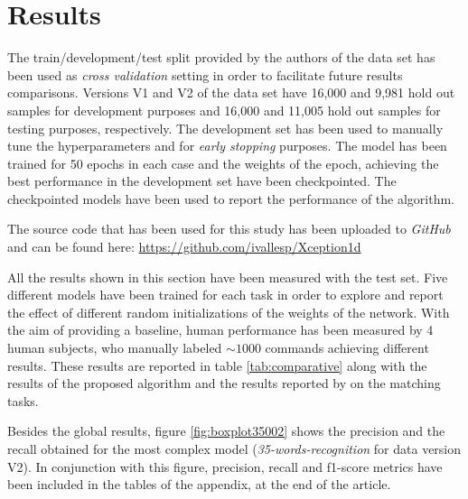 \documentclass[review]{elsarticle}
\begin{document}
\section{Results} \label{sec:results}
The train/development/test split provided by the authors of the data set \cite{speechcommands} has been used as \textit{cross validation} setting in order to facilitate future results comparisons. Versions V1 and V2 of the data set have 16,000 and 9,981 hold out samples for development purposes and 16,000 and 11,005 hold out samples for testing purposes, respectively. The development set has been used to manually tune the hyperparameters and for \textit{early stopping} purposes. The model has been trained for 50 epochs in each case and the weights of the epoch, achieving the best performance in the development set have been checkpointed. The checkpointed models have been used to report the performance of the algorithm.

 The source code that has been used for this study has been uploaded to \textit{GitHub} and can be found here: \url{https://github.com/ivallesp/Xception1d}

All the results shown in this section have been measured with the test set. Five different models have been trained for each task in order to explore and report the effect of different random initializations of the weights of the network. With the aim of providing a baseline, human performance has been measured by 4 human subjects, who manually labeled $\sim 1000$ commands achieving different results. These results are reported in table \ref{tab:comparative} along with the results of the proposed algorithm and the results reported by \cite{Andrade2018, McMahan2018, Warden2018, Zhang2017} on the matching tasks.

Besides the global results, figure \ref{fig:boxplot35002} shows the precision and the recall obtained for the most complex model (\textit{35-words-recognition} for data version V2). In conjunction with this figure, precision, recall and f1-score metrics have been included in the tables of the appendix, at the end of the article. 
\end{document}
